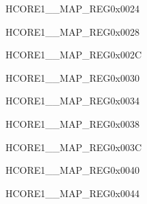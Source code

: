 \begin{register}{H}{CORE1\_\_MAP\_REG}{0x0024}\label{regdesc:CORE1LPADCINTMAPREG}
\end{register}\vspace{-3em}


\begin{register}{H}{CORE1\_\_MAP\_REG}{0x0028}\label{regdesc:CORE1LPGPIOINTMAPREG}
\end{register}\vspace{-3em}


\begin{register}{H}{CORE1\_\_MAP\_REG}{0x002C}\label{regdesc:CORE1LPI2CINTMAPREG}
\end{register}\vspace{-3em}


\begin{register}{H}{CORE1\_\_MAP\_REG}{0x0030}\label{regdesc:CORE1LPI2SINTMAPREG}
\end{register}\vspace{-3em}


\begin{register}{H}{CORE1\_\_MAP\_REG}{0x0034}\label{regdesc:CORE1LPSPIINTMAPREG}
\end{register}\vspace{-3em}


\begin{register}{H}{CORE1\_\_MAP\_REG}{0x0038}\label{regdesc:CORE1LPTOUCHINTMAPREG}
\end{register}\vspace{-3em}


\begin{register}{H}{CORE1\_\_MAP\_REG}{0x003C}\label{regdesc:CORE1LPTSENSINTMAPREG}
\end{register}\vspace{-3em}


\begin{register}{H}{CORE1\_\_MAP\_REG}{0x0040}\label{regdesc:CORE1LPUARTINTMAPREG}
\end{register}\vspace{-3em}


\begin{register}{H}{CORE1\_\_MAP\_REG}{0x0044}\label{regdesc:CORE1LPEFUSEINTMAPREG}
\end{register}\vspace{-3em}



